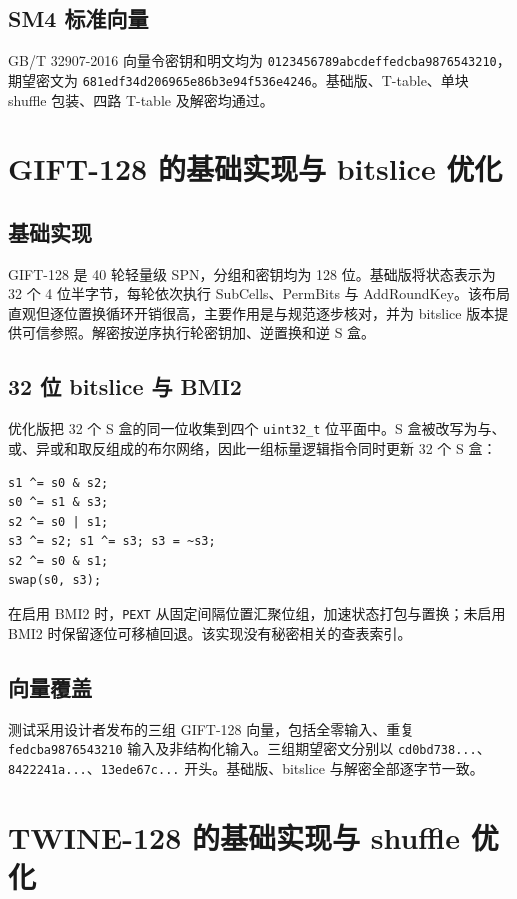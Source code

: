 \documentclass[a4paper,12pt]{ctexart}
\begin{document}
\subsection{SM4 标准向量}

GB/T 32907-2016 向量令密钥和明文均为 \texttt{0123456789abcdeffedcba9876543210}，期望密文为 \texttt{681edf34d206965e86b3e94f536e4246}。基础版、T-table、单块 shuffle 包装、四路 T-table 及解密均通过。

\section{GIFT-128 的基础实现与 bitslice 优化}

\subsection{基础实现}

GIFT-128 是 40 轮轻量级 SPN，分组和密钥均为 128 位。基础版将状态表示为 32 个 4 位半字节，每轮依次执行 SubCells、PermBits 与 AddRoundKey。该布局直观但逐位置换循环开销很高，主要作用是与规范逐步核对，并为 bitslice 版本提供可信参照。解密按逆序执行轮密钥加、逆置换和逆 S 盒。

\subsection{32 位 bitslice 与 BMI2}

优化版把 32 个 S 盒的同一位收集到四个 \texttt{uint32\_t} 位平面中。S 盒被改写为与、或、异或和取反组成的布尔网络，因此一组标量逻辑指令同时更新 32 个 S 盒：
\begin{lstlisting}
s1 ^= s0 & s2;
s0 ^= s1 & s3;
s2 ^= s0 | s1;
s3 ^= s2; s1 ^= s3; s3 = ~s3;
s2 ^= s0 & s1;
swap(s0, s3);
\end{lstlisting}
在启用 BMI2 时，\texttt{PEXT} 从固定间隔位置汇聚位组，加速状态打包与置换；未启用 BMI2 时保留逐位可移植回退。该实现没有秘密相关的查表索引。

\subsection{向量覆盖}

测试采用设计者发布的三组 GIFT-128 向量，包括全零输入、重复 \texttt{fedcba9876543210} 输入及非结构化输入。三组期望密文分别以 \texttt{cd0bd738...}、\texttt{8422241a...}、\texttt{13ede67c...} 开头。基础版、bitslice 与解密全部逐字节一致。

\section{TWINE-128 的基础实现与 shuffle 优化}
\end{document}

